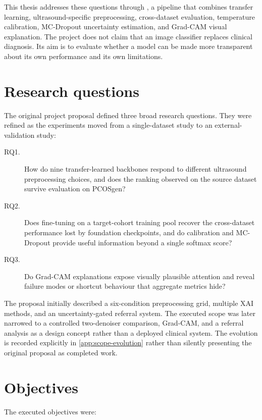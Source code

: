 \documentclass[../preamble.tex]{subfiles}
\begin{document}
This thesis addresses these questions through \PEARL{}, a pipeline that
combines transfer learning, ultrasound-specific preprocessing, cross-dataset
evaluation, temperature calibration, MC-Dropout uncertainty estimation, and
Grad-CAM visual explanation. The project does not claim that an image
classifier replaces clinical diagnosis. Its aim is to evaluate whether a
model can be made more transparent about its own performance and its own
limitations.

\section{Research questions}
\label{sec:intro-rq}

The original project proposal defined three broad research questions. They
were refined as the experiments moved from a single-dataset study to an
external-validation study:

\begin{description}
  \item[RQ1.] How do nine transfer-learned backbones respond to different
    ultrasound preprocessing choices, and does the ranking observed on the
    source dataset survive evaluation on PCOSgen?
  \item[RQ2.] Does fine-tuning on a target-cohort training pool recover the
    cross-dataset performance lost by foundation checkpoints, and do
    calibration and MC-Dropout provide useful information beyond a single
    softmax score?
  \item[RQ3.] Do Grad-CAM explanations expose visually plausible attention and
    reveal failure modes or shortcut behaviour that aggregate metrics hide?
\end{description}

The proposal initially described a six-condition preprocessing grid, multiple
XAI methods, and an uncertainty-gated referral system. The executed scope was
later narrowed to a controlled two-denoiser comparison, Grad-CAM, and a
referral analysis as a design concept rather than a deployed clinical system.
The evolution is recorded explicitly in \cref{app:scope-evolution} rather than
silently presenting the original proposal as completed work.

\section{Objectives}
\label{sec:intro-objectives}

The executed objectives were:
\end{document}
